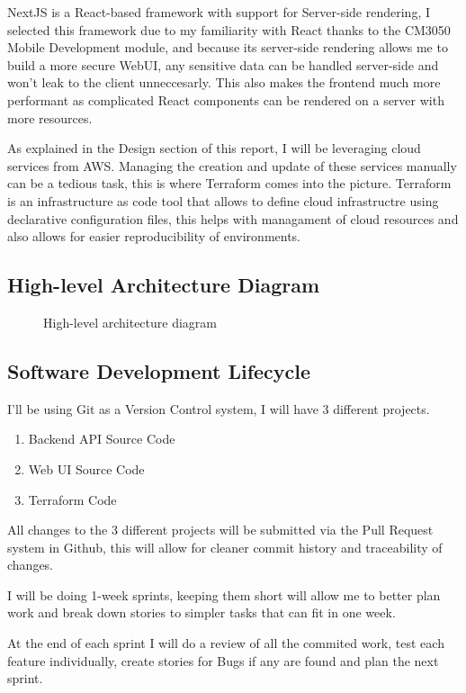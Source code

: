 \documentclass{article}
\newcommand{\widefig}[3][1.2\textwidth]{%
  \begin{figure}[H]
    \makebox[\textwidth][c]{%
      \texttt{[image: \#2]}%
    }
    \caption{#3}
  \end{figure}
}
\begin{document}
  NextJS is a React-based framework with support for Server-side rendering, I selected this framework due to my familiarity with React thanks to the CM3050 Mobile Development module, and because its server-side rendering allows me to build a more secure WebUI, any sensitive data can be handled server-side and won't leak to the client unneccesarly. This also makes the frontend much more performant as complicated React components can be rendered on a server with more resources.

  As explained in the Design section of this report, I will be leveraging cloud services from AWS.
  Managing the creation and update of these services manually can be a tedious task, this is where Terraform comes into the picture. Terraform is an infrastructure as code tool that allows to define cloud infrastructre using declarative configuration files, this helps with managament of cloud resources and also allows for easier reproducibility of environments.

  \subsection{High-level Architecture Diagram}

  \widefig{architecture.png}{High-level architecture diagram}

  \subsection{Software Development Lifecycle}
  I'll be using Git as a Version Control system, I will have 3 different projects.

  \begin{enumerate}
    \item Backend API Source Code
    \item Web UI Source Code
    \item Terraform Code
  \end{enumerate}

  All changes to the 3 different projects will be submitted via the Pull Request system in Github, this will allow for cleaner commit history and traceability of changes.
  
  I will be doing 1-week sprints, keeping them short will allow me to better plan work and break down stories to simpler tasks that can fit in one week.

  At the end of each sprint I will do a review of all the commited work, test each feature individually, create stories for Bugs if any are found and plan the next sprint.
\end{document}
